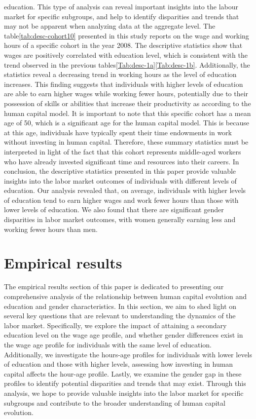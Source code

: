 \documentclass[12pt]{article}
\begin{document}
education. This type of analysis can reveal important insights into the labour market for specific subgroups, and help
to identify disparities and trends that may not be apparent when analyzing data at the aggregate level.
\newline
The table\ref{tab:desc-cohort10} presented in this study reports on the wage and working hours of a specific cohort in the
year 2008. The descriptive statistics show that wages are positively correlated with education level, which is
consistent with the trend observed in the previous  tables\ref{Tab:desc-1a}\ref{Tab:desc-1b}. Additionally, the
statistics reveal a decreasing trend in working hours as the level of education increases. This finding suggests that
individuals with higher levels of education are able to earn higher wages while working fewer hours, potentially due to
their possession of skills or abilities that increase their productivity as according to the human capital model. It is
important to note that this specific cohort has a mean age of 50, which is a significant age for the human capital
model. This is because at this age, individuals have typically spent their time endowments in work without investing in
human capital. Therefore, these summary statistics must be interpreted in light of the fact that this cohort represents
middle-aged workers who have already invested significant time and resources into their careers.\newline
In conclusion, the descriptive statistics presented in this paper provide valuable insights into the labor market
outcomes of individuals with different levels of education. Our analysis revealed that, on average, individuals with
higher levels of education tend to earn higher wages and work fewer hours than those with lower levels of education. We
also found that there are significant gender disparities in labor market outcomes, with women generally earning less and
working fewer hours than men.
\section{Empirical results}
The empirical results section of this paper is dedicated to presenting our comprehensive analysis of the relationship
between human capital evolution and education and gender characteristics. In this section, we aim to shed light on
several key questions that are relevant to understanding the dynamics of the labor market. Specifically, we explore the
impact of attaining a secondary education level on the wage age profile, and whether gender differences exist in the
wage age profile for individuals with the same level of education. Additionally, we investigate the hours-age profiles
for individuals with lower levels of education and those with higher levels, assessing how investing in human capital
affects the hour-age profile. Lastly, we examine the gender gap in these profiles to identify potential disparities and
trends that may exist. Through this analysis, we hope to provide valuable insights into the labor market for specific
subgroups and contribute to the broader understanding of human capital evolution.
\end{document}
